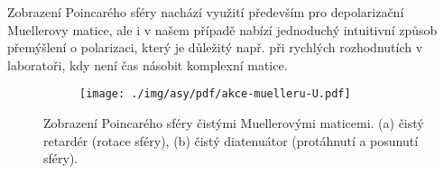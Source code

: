 Zobrazení Poincarého sféry nachází využití především pro depolarizační Muellerovy matice, ale i v našem případě nabízí jednoduchý intuitivní způsob přemýšlení o polarizaci, který je důležitý např. při rychlých rozhodnutích v laboratoři, kdy není čas násobit komplexní matice.

\begin{figure}[htbp]
    \centering
    \begin{subfigure}{.4\textwidth}
        \centering
        \texttt{[image: ./img/asy/pdf/akce-muelleru-U.pdf]}
    \end{subfigure}
    \begin{subfigure}{.55\textwidth}
        \centering
    \end{subfigure}
    \caption{Zobrazení Poincarého sféry čistými Muellerovými maticemi. (a) čistý retardér (rotace sféry), (b) čistý diatenuátor (protáhnutí a posunutí sféry).}
    \label{fig:UH-Mueller}
\end{figure}
